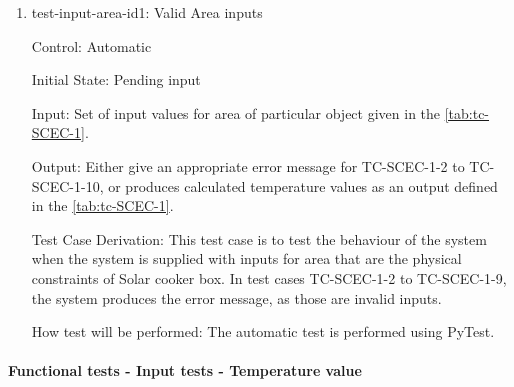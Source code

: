 \documentclass[12pt, titlepage]{article}
\begin{document}
\begin{enumerate}

\item{test-input-area-id1: Valid Area inputs  \\}
\label{test-id-1}

Control: Automatic
					
Initial State: Pending input 
					
Input: Set of input values for area of particular object given in the \autoref{tab:tc-SCEC-1}. 
					
Output: Either give an appropriate error message for TC-SCEC-1-2 to TC-SCEC-1-10, or produces calculated temperature values as an output defined in the \autoref{tab:tc-SCEC-1}. 

Test Case Derivation: This test case is to test the behaviour of the system when the system is supplied with inputs for area that are the physical constraints of Solar cooker box. In test cases TC-SCEC-1-2 to TC-SCEC-1-9, the system produces the error message, as those are invalid inputs.     
					
How test will be performed: The automatic test is performed using PyTest.  

\end{enumerate}

\paragraph{Functional tests - Input tests - Temperature value}
\end{document}
